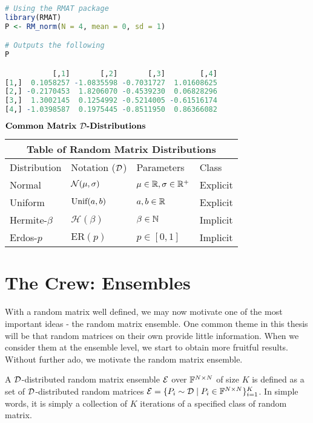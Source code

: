 \begin{lstlisting}[language=R]
# Using the RMAT package
library(RMAT)
P <- RM_norm(N = 4, mean = 0, sd = 1)

# Outputs the following
P

           [,1]       [,2]       [,3]        [,4]
[1,]  0.1058257 -1.0835598 -0.7031727  1.01608625
[2,] -0.2170453  1.8206070 -0.4539230  0.06828296
[3,]  1.3002145  0.1254992 -0.5214005 -0.61516174
[4,] -1.0398587  0.1975445 -0.8511950  0.86366082
\end{lstlisting}


\begin{center}
$\textbf{Common Matrix $\mathcal{D}$-Distributions}$
\end{center}

\begin{tabular}{ |p{3cm}||p{3cm}|p{3cm}|p{3cm}|  }
 \hline
 \multicolumn{4}{|c|}{Table of Random Matrix Distributions} \\
 \hline
 Distribution & Notation ($\mathcal{D}$) & Parameters & Class\\
 \hline
 Normal & $\mathcal{N}(\mu,\sigma)$ & $\mu \in \mathbb{R}, \sigma \in \mathbb{R}^+$  &  Explicit\\
 Uniform  & $\text{Unif}(a,b)$ & $a,b \in \mathbb{R}$ & Explicit\\
 Hermite-$\beta$   & $\mathcal{H}(\beta)$  &  $\beta \in \mathbb{N}$  & Implicit\\
 Erdos-$p$   &   $\text{ER}(p)$  & $p \in [0,1]$   & Implicit\\
 \hline
\end{tabular}

\newpage

\section{The Crew: Ensembles}

With a random matrix well defined, we may now motivate one of the most important ideas - the random matrix ensemble. One common theme in this thesis will be that random matrices on their own provide little information. When we consider them at the ensemble level, we start to obtain more fruitful results. Without further ado, we motivate the random matrix ensemble.

\begin{definition}
A $\mathcal{D}$-distributed random matrix ensemble $\mathcal{E}$ over $\mathbb{F}^{N \times N}$ of size $K$ is defined as a set of $\mathcal{D}$-distributed random matrices $\mathcal{E} = \{P_i \sim \mathcal{D} \mid P_i \in \mathbb{F}^{N \times N}\}_{i = 1}^K$. In simple words, it is simply a collection of $K$ iterations of a specified class of random matrix.
\end{definition}

